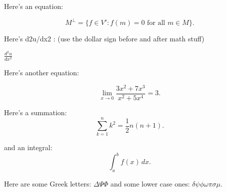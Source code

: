 Here's an equation:

\[ M^\bot = \{ f \in V' : f(m) = 0 \mbox{ for all } m \in M \}.\]

Here's d2u/dx2 : (use the dollar sign before and after math stuff)

$ \frac{d^2 u}{dx^2} $


Here's another equation:

\[ \lim_{x \to 0} \frac{3x^2 +7x^3}{x^2 +5x^4} = 3.\]

Here's a summation:
\[ \sum_{k=1}^n k^2 = \frac{1}{2} n (n+1).\] 

and an integral:
\[ \int_a^b f(x)\,dx.\]

Here are some Greek letters:
$ \Delta \Psi \Phi $
and some lower case ones:
$ \delta \psi \phi \omega \pi \sigma \mu $.
